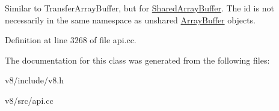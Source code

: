 Similar to Transfer\+Array\+Buffer, but for \mbox{\hyperlink{classv8_1_1SharedArrayBuffer}{Shared\+Array\+Buffer}}. The id is not necessarily in the same namespace as unshared \mbox{\hyperlink{classv8_1_1ArrayBuffer}{Array\+Buffer}} objects. 

Definition at line 3268 of file api.\+cc.



The documentation for this class was generated from the following files\+:\begin{DoxyCompactItemize}
\item 
v8/include/v8.\+h\item 
v8/src/api.\+cc\end{DoxyCompactItemize}
